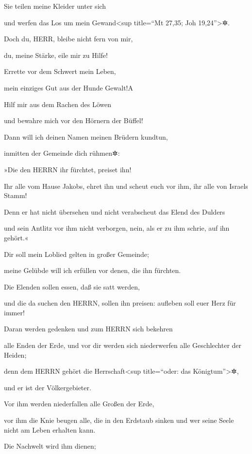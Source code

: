 Sie teilen meine Kleider unter sich

und werfen das Los um mein Gewand\textless sup title=``Mt 27,35; Joh
19,24''\textgreater✲.

Doch du, HERR, bleibe nicht fern von mir,

du, meine Stärke, eile mir zu Hilfe!

Errette vor dem Schwert mein Leben,

mein einziges Gut aus der Hunde Gewalt!{A}

Hilf mir aus dem Rachen des Löwen

und bewahre mich vor den Hörnern der Büffel!

Dann will ich deinen Namen meinen Brüdern kundtun,

inmitten der Gemeinde dich rühmen✲:

»Die den HERRN ihr fürchtet, preiset ihn!

Ihr alle vom Hause Jakobs, ehret ihn und scheut euch vor ihm, ihr alle
von Israels Stamm!

Denn er hat nicht übersehen und nicht verabscheut das
Elend des Dulders

und sein Antlitz vor ihm nicht verborgen, nein, als er zu ihm schrie,
auf ihn gehört.«

Dir soll mein Loblied gelten in großer Gemeinde;

meine Gelübde will ich erfüllen vor denen, die ihn fürchten.

Die Elenden sollen essen, daß sie satt werden,

und die da suchen den HERRN, sollen ihn preisen: aufleben soll euer Herz
für immer!

Daran werden gedenken und zum HERRN sich bekehren

alle Enden der Erde, und vor dir werden sich niederwerfen alle
Geschlechter der Heiden;

denn dem HERRN gehört die Herrschaft\textless sup
title=``oder: das Königtum''\textgreater✲,

und er ist der Völkergebieter.

Vor ihm werden niederfallen alle Großen der Erde,

vor ihm die Knie beugen alle, die in den Erdstaub sinken und wer seine
Seele nicht am Leben erhalten kann.

Die Nachwelt wird ihm dienen;

